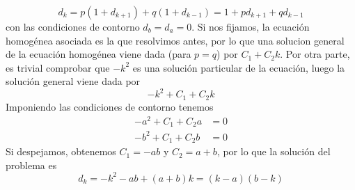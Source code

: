 \documentclass[twoside]{article}
\begin{document}
\begin{solucion}
$$
d_k = p(1+d_{k+1})+q(1+d_{k-1})=1+pd_{k+1}+qd_{k-1}
$$
con las condiciones de contorno $d_b = d_a = 0$. Si nos fijamos, la ecuación homogénea asociada es la que resolvimos antes, por lo que una solucion general de la ecuación homogénea viene dada (para $p=q$) por $C_1+C_2k$. Por otra parte, es trivial comprobar que $-k^2$ es una solución particular de la ecuación, luego la solución general viene dada por
$$
-k^2 + C_1+ C_2k 
$$
Imponiendo las condiciones de contorno tenemos
\begin{align*}
-a^2 + C_1 + C_2a &=0\\
-b^2+C_1 +C_2b &=0
\end{align*}
Si despejamos, obtenemos $C_1 = -ab$ y $C_2 = a+b$, por lo que la solución del problema es
$$
d_k = -k^2 -ab + (a+b)k = (k-a)(b-k)
$$
\end{solucion}


\newpage
\end{document}
